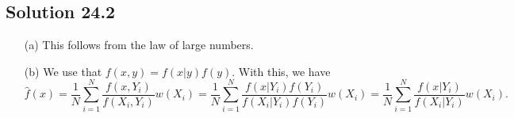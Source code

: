 \subsection*{Solution 24.2}

\begin{itemize}
    \item[(a)] This follows from the law of large numbers.
    \item[(b)] We use that $f(x, y) = f(x|y) f(y)$.
        With this, we have
        \begin{equation*}
            \hat{f}(x) = \frac{1}{N} \sum_{i = 1}^N \frac{f(x, Y_i)}{f(X_i, Y_i)} w(X_i)
                = \frac{1}{N} \sum_{i = 1}^N \frac{f(x|Y_i) f(Y_i)}{f(X_i|Y_i) f(Y_i)} w(X_i)
                = \frac{1}{N} \sum_{i = 1}^N \frac{f(x|Y_i)}{f(X_i|Y_i)} w(X_i).
        \end{equation*}
\end{itemize}
